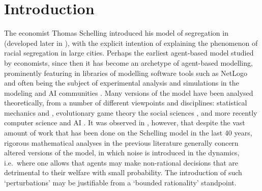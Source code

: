 \documentclass[11pt]{article}
\theoremstyle{plain}
\numberwithin{equation}{subsection}
\begin{document}
\section{Introduction}
The economist Thomas Schelling introduced his model of segregation in 
 \cite{TS1} (developed later in \cite{TS71a, TS71b}), with the explicit intention of 
 explaining the phenomenon of
racial segregation in large cities. 
Perhaps the earliest 
agent-based model studied by economists, since then it has become 
an archetype of agent-based modelling, prominently
featuring in libraries of modelling software tools such as NetLogo \cite{NetLogo}
and often being the subject of 
experimental analysis and simulations in the modeling and AI communities 
\cite{MF, howtop, FMpref, Gilbert14052002, Martijn2007, yilmaz2009agent, heppenstall2011agent, 
deSmith:2007:GAC:1557282, epstein1996growing}.
Many versions of the model have been analysed theoretically, from
a number of different viewpoints and disciplines: statistical mechanics
\cite{DM, RevModPhys.81.591} and \cite[Section 3.1]{Bertin}, 
evolutionary game theory \cite{HY, JZ1, JZ2, JZ3}
the social sciences \cite{CF, Clarkdem, SandSDo}, and more recently
computer science and AI \cite{CACP07, DBLP:conf/soda/BhaktaMR14, brandt:an, BELschel13}. 
It was observed in \cite{brandt:an}, however,  that despite the vast amount of work that has been
done on the Schelling model in the last 40 years, rigorous mathematical analyses in the previous  literature generally 
concern altered versions of the model, in which noise is introduced in the dynamics, i.e.\ where
one allows that agents may make non-rational decisions that are
detrimental to their welfare with small probability.
The introduction of such `perturbations' may be justifiable from a
`bounded rationality' standpoint. 
\end{document}
